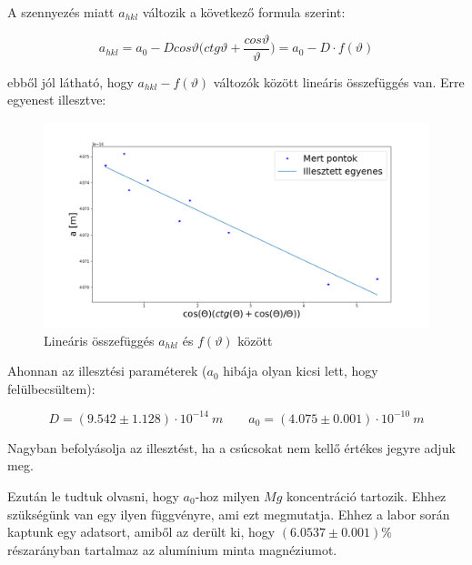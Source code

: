 \documentclass[a4paper,12pt]{article}
\begin{document}
\par A szennyezés miatt $a_{hkl}$ változik a következő formula szerint:

\begin{equation*}
a_{hkl} = a_{0} - Dcos\vartheta\Big(ctg\vartheta + \frac{cos\vartheta}{\vartheta}\Big) = a_{0} - D\cdot f(\vartheta)
\end{equation*}

\par ebből jól látható, hogy $a_{hkl} - f(\vartheta)$ változók között lineáris összefüggés van. Erre egyenest illesztve:

\begin{figure}[H]
\centering
\includegraphics[width=1\textwidth]{./egyenes.png}
\caption{Lineáris összefüggés $a_{hkl}$ és $f(\vartheta)$ között}
\end{figure} 

\par Ahonnan az illesztési paraméterek ($a_{0}$ hibája olyan kicsi lett, hogy felülbecsültem):

\begin{equation*}
D = (9.542 \pm 1.128) \cdot 10^{-14} ~m \quad \quad
a_{0} = (4.075 \pm 0.001) \cdot 10^{-10} ~m
\end{equation*}

\par Nagyban befolyásolja az illesztést, ha a csúcsokat nem kellő értékes jegyre adjuk meg.

\par Ezután le tudtuk olvasni, hogy $a_{0}$-hoz milyen $Mg$ koncentráció tartozik. Ehhez szükségünk van egy ilyen függvényre, ami ezt megmutatja. Ehhez a labor során kaptunk egy adatsort, amiből az derült ki, hogy $(6.0537 \pm 0.001)\%$ részarányban tartalmaz az alumínium minta magnéziumot.
\end{document}
